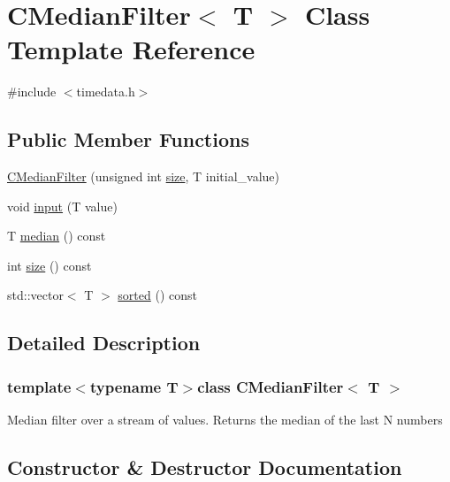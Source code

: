 \hypertarget{class_c_median_filter}{}\section{C\+Median\+Filter$<$ T $>$ Class Template Reference}
\label{class_c_median_filter}


{\ttfamily \#include $<$timedata.\+h$>$}

\subsection*{Public Member Functions}
\begin{DoxyCompactItemize}
\item 
\hyperlink{class_c_median_filter_a181463ed081ece10fd437875243d9cad}{C\+Median\+Filter} (unsigned int \hyperlink{class_c_median_filter_a0791303910a3a11adbc127f9fe4e3a9e}{size}, T initial\+\_\+value)
\item 
void \hyperlink{class_c_median_filter_ae10cde98866b034ec73c530be4c60874}{input} (T value)
\item 
T \hyperlink{class_c_median_filter_aab6b67fbb63024c462bfa30bbe789c31}{median} () const 
\item 
int \hyperlink{class_c_median_filter_a0791303910a3a11adbc127f9fe4e3a9e}{size} () const 
\item 
std\+::vector$<$ T $>$ \hyperlink{class_c_median_filter_afbfe7258f17cec5cc7f2f105d03b0567}{sorted} () const 
\end{DoxyCompactItemize}


\subsection{Detailed Description}
\subsubsection*{template$<$typename T$>$class C\+Median\+Filter$<$ T $>$}

Median filter over a stream of values. Returns the median of the last N numbers 

\subsection{Constructor \& Destructor Documentation}
\hypertarget{class_c_median_filter_a181463ed081ece10fd437875243d9cad}{}
